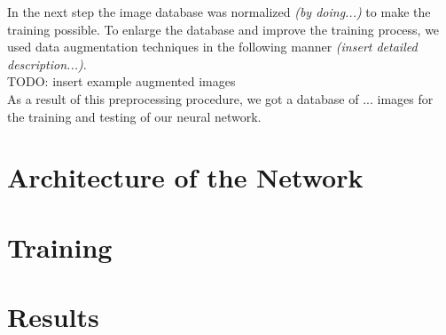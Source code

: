 \documentclass{tubaf-article}
\begin{document}
	In the next step the image database was normalized \emph{(by doing...)} to make the training possible. To enlarge the database and improve the training process, we used data augmentation techniques in the following manner \emph{(insert detailed description...)}. \\
	TODO: insert example augmented images \\
	As a result of this preprocessing procedure, we got a database of ... images for the training and testing of our neural network.
	
	
	\section{Architecture of the Network}
	\label{architecture}
	
	\section{Training}
	\label{training}
	
	\section{Results}
	\label{results}
	
\end{document}
